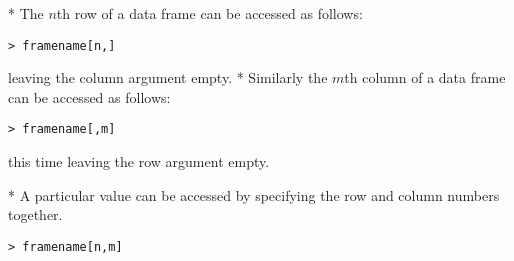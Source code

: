 \begin{itemize}
* The $n$th row of a data frame can be accessed as follows:
\begin{verbatim}
> framename[n,]
\end{verbatim}
leaving the column argument empty. * Similarly the $m$th
column of a data frame can be accessed as follows:
\begin{verbatim}
> framename[,m]
\end{verbatim}
this time leaving the row argument empty.

* A particular value can be accessed by specifying the row and
column numbers together.
\begin{verbatim}
> framename[n,m]
\end{verbatim}
\end{itemize}








